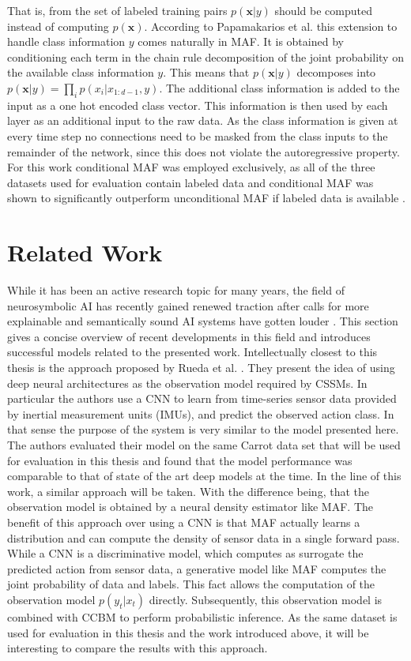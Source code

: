 \documentclass[11pt,titlepage,oneside,openany]{book}
\begin{document}
That is, from the set of labeled training pairs $p(\pmb{x}|y)$ should be computed instead of computing $p(\pmb{x})$. According to Papamakarios et al. \cite{papamakarios_masked_2017} this extension to handle class information $y$ comes naturally in MAF. It is obtained by conditioning each term in the chain rule decomposition of the joint probability on the available class information $y$. This means that $p(\pmb{x}|y)$ decomposes into $p(\pmb{x}|y) = \prod_{i}^{} p(x_i|x_{1:d-1},y)$. The additional class information is added to the input as a one hot encoded class vector. This information is then used by each layer as an additional input to the raw data. As the class information is given at every time step no connections need to be masked from the class inputs to the remainder of the network, since this does not violate the autoregressive property. For this work conditional MAF was employed exclusively, as all of the three datasets used for evaluation contain labeled data and conditional MAF was shown to significantly outperform unconditional MAF if labeled data is available \cite{papamakarios_masked_2017}.


\chapter{Related Work}
\label{cha:rel}

While it has been an active research topic for many years, the field of neurosymbolic AI has recently gained renewed traction after calls for more explainable and semantically sound AI systems have gotten louder \cite{garcez_neurosymbolic_2020}. This section gives a concise overview of recent developments in this field and introduces successful models related to the presented work.
Intellectually closest to this thesis is the approach proposed by Rueda et al. \cite{rueda_combining_2019}. They present the idea of using deep neural architectures as the observation model required by CSSMs. In particular the authors use a CNN to learn from time-series sensor data provided by inertial measurement units (IMUs), and predict the observed action class. In that sense the purpose of the system is very similar to the model presented here. The authors evaluated their model on the same Carrot data set that will be used for evaluation in this thesis and found that the model performance was comparable to that of state of the art deep models at the time. In the line of this work, a similar approach will be taken. With the difference being, that the observation model is obtained by a neural density estimator like MAF. The benefit of this approach over using a CNN is that MAF actually learns a distribution and can compute the density of sensor data in a single forward pass. While a CNN is a discriminative model, which computes as surrogate the predicted action from sensor data, a generative model like MAF computes the joint probability of data and labels. This fact allows the computation of the observation model $p(y_t|x_t)$ directly. Subsequently, this observation model is combined with CCBM to perform probabilistic inference. As the same dataset is used for evaluation in this thesis and the work introduced above, it will be interesting to compare the results with this approach.
\end{document}
